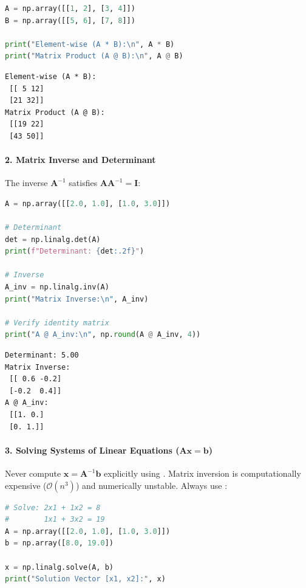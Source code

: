\begin{lstlisting}[language=Python]
A = np.array([[1, 2], [3, 4]])
B = np.array([[5, 6], [7, 8]])

print("Element-wise (A * B):\n", A * B)
print("Matrix Product (A @ B):\n", A @ B)
\end{lstlisting}

\begin{lstlisting}[style=outputstyle]
Element-wise (A * B):
 [[ 5 12]
 [21 32]]
Matrix Product (A @ B):
 [[19 22]
 [43 50]]
\end{lstlisting}

\paragraph{2. Matrix Inverse and Determinant}
The inverse $\mathbf{A}^{-1}$ satisfies $\mathbf{A} \mathbf{A}^{-1} = \mathbf{I}$:
\begin{lstlisting}[language=Python]
A = np.array([[2.0, 1.0], [1.0, 3.0]])

# Determinant
det = np.linalg.det(A)
print(f"Determinant: {det:.2f}")

# Inverse
A_inv = np.linalg.inv(A)
print("Matrix Inverse:\n", A_inv)

# Verify identity matrix
print("A @ A_inv:\n", np.round(A @ A_inv, 4))
\end{lstlisting}

\begin{lstlisting}[style=outputstyle]
Determinant: 5.00
Matrix Inverse:
 [[ 0.6 -0.2]
 [-0.2  0.4]]
A @ A_inv:
 [[1. 0.]
 [0. 1.]]
\end{lstlisting}

\paragraph{3. Solving Systems of Linear Equations ($\mathbf{A}\mathbf{x} = \mathbf{b}$)}
Never compute $\mathbf{x} = \mathbf{A}^{-1}\mathbf{b}$ explicitly using . Matrix inversion is computationally expensive ($\mathcal{O}(n^3)$) and numerically unstable. Always use :

\begin{lstlisting}[language=Python]
# Solve: 2x1 + 1x2 = 8
#        1x1 + 3x2 = 19
A = np.array([[2.0, 1.0], [1.0, 3.0]])
b = np.array([8.0, 19.0])

x = np.linalg.solve(A, b)
print("Solution Vector [x1, x2]:", x)
\end{lstlisting}

